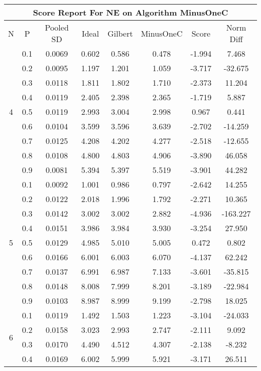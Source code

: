 \documentclass[11pt,a4paper]{report}
\begin{document}
\begin{longtable}{ | c | c || c | c | c | c | c | c | }
\hline
\multicolumn{8}{|c|}{ Score Report For NE on Algorithm MinusOneC} \\
\hline
N & P & Pooled SD &  Ideal &  Gilbert & MinusOneC  & Score & Norm Diff \\
 \hline
 \hline
 \endhead
\multirow{9}{*}{4} & 0.1 & 0.0069 & 0.602 & 0.586 & 0.478 & -1.994 & 7.468 \\
 & 0.2 & 0.0095 & 1.197 & 1.201 & 1.059 & -3.717 & -32.675 \\
 & 0.3 & 0.0118 & 1.811 & 1.802 & 1.710 & -2.373 & 11.204 \\
 & 0.4 & 0.0119 & 2.405 & 2.398 & 2.365 & -1.719 & 5.887 \\
 & 0.5 & 0.0119 & 2.993 & 3.004 & 2.998 & 0.967 & 0.441 \\
 & 0.6 & 0.0104 & 3.599 & 3.596 & 3.639 & -2.702 & -14.259 \\
 & 0.7 & 0.0125 & 4.208 & 4.202 & 4.277 & -2.518 & -12.655 \\
 & 0.8 & 0.0108 & 4.800 & 4.803 & 4.906 & -3.890 & 46.058 \\
 & 0.9 & 0.0081 & 5.394 & 5.397 & 5.519 & -3.901 & 44.282 \\
 \hline
\multirow{9}{*}{5} & 0.1 & 0.0092 & 1.001 & 0.986 & 0.797 & -2.642 & 14.255 \\
 & 0.2 & 0.0122 & 2.018 & 1.996 & 1.792 & -2.271 & 10.365 \\
 & 0.3 & 0.0142 & 3.002 & 3.002 & 2.882 & -4.936 & -163.227 \\
 & 0.4 & 0.0151 & 3.986 & 3.984 & 3.930 & -3.254 & 27.950 \\
 & 0.5 & 0.0129 & 4.985 & 5.010 & 5.005 & 0.472 & 0.802 \\
 & 0.6 & 0.0166 & 6.001 & 6.003 & 6.070 & -4.137 & 62.242 \\
 & 0.7 & 0.0137 & 6.991 & 6.987 & 7.133 & -3.601 & -35.815 \\
 & 0.8 & 0.0148 & 8.008 & 7.999 & 8.201 & -3.189 & -22.984 \\
 & 0.9 & 0.0103 & 8.987 & 8.999 & 9.199 & -2.798 & 18.025 \\
 \hline
\multirow{9}{*}{6} & 0.1 & 0.0119 & 1.492 & 1.503 & 1.223 & -3.104 & -24.033 \\
 & 0.2 & 0.0158 & 3.023 & 2.993 & 2.747 & -2.111 & 9.092 \\
 & 0.3 & 0.0170 & 4.490 & 4.512 & 4.307 & -2.138 & -8.232 \\
 & 0.4 & 0.0169 & 6.002 & 5.999 & 5.921 & -3.171 & 26.511 \\

\end{longtable}
\end{document}
